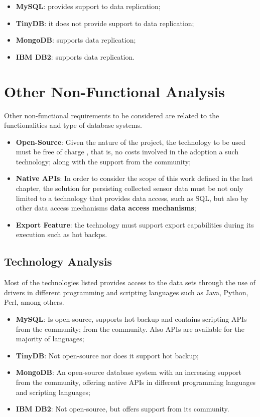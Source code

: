 \begin{itemize}
  \item \textbf{MySQL}: provides support to data replication;
  \item \textbf{TinyDB}: it does not provide support to data replication;
  \item \textbf{MongoDB}: supports data replication;
  \item \textbf{IBM DB2}: supports data replication.
\end{itemize}

\section{Other Non-Functional Analysis}

Other non-functional requirements to be considered are related to the
functionalities and type of database systems.

\begin{itemize}
  \item \textbf{Open-Source}: Given the nature of the project, the
  technology to be used must be free of charge \cite{open-source}, that is, no
  costs involved in the adoption a such technology; along with the support from
  the community;
  \item \textbf{Native APIs}: In order to consider the scope of this work
  defined in the last chapter, the solution for persisting collected sensor
  data must be not only limited to a technology that provides data access, such
  as SQL, but also by other data access mechanisms \textbf{data access
  mechanisms};
  \item \textbf{Export Feature}: the technology must support export
  capabilities during its execution such as hot backps.
\end{itemize}

\subsection{Technology Analysis}

Most of the technologies listed provides access to the data sets through the
use of drivers in different programming and scripting languages such as Java,
Python, Perl, among others.

\begin{itemize}
  \item \textbf{MySQL}: Is  open-source, supports hot backup and contains
  scripting APIs from  the community;
  from the community. Also APIs are available for the majority of languages;
  \item \textbf{TinyDB}: Not open-source nor does it support hot backup;
  \item \textbf{MongoDB}: An open-source database system with an increasing
  support from  the community, offering native APIs in different programming
  languages and scripting languages;
  \item \textbf{IBM DB2}: Not open-source, but offers support from its
  community.
\end{itemize}

